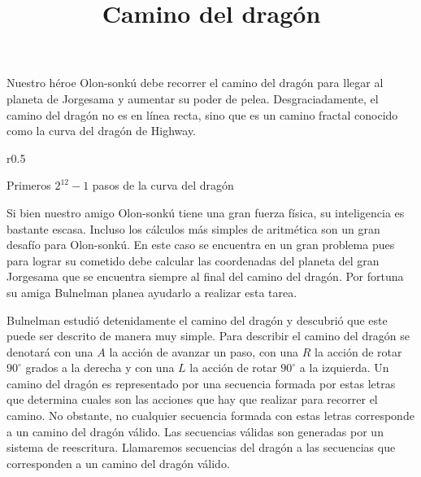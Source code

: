 \documentclass{oci}
\title{Camino del drag\'on}
\begin{document}
\maketitle
Nuestro héroe Olon-sonkú debe recorrer el camino del dragón para llegar al planeta de Jorgesama y aumentar su poder de pelea. Desgraciadamente, el camino del dragón no es en línea recta, sino que es un camino fractal conocido como la curva del dragón de Highway.


\begin{wrapfigure}{r}{0.5\textwidth}
	\begin{center}
			
		Primeros $2^{12}-1$ pasos de la curva del dragón
	\end{center}
\end{wrapfigure}

Si bien nuestro amigo Olon-sonkú tiene una gran fuerza física, su inteligencia es bastante escasa.
Incluso los cálculos más simples de aritmética son un gran desafío para Olon-sonkú.
En este caso se encuentra en un gran problema pues para lograr su cometido debe calcular las coordenadas del planeta del gran Jorgesama que se encuentra siempre al final del camino del dragón.
Por fortuna su amiga Bulnelman planea ayudarlo a realizar esta tarea.

Bulnelman estudió detenidamente el camino del dragón y descubrió que este puede ser descrito de manera muy simple.
Para describir el camino del dragón se denotará con una $A$ la acción de avanzar un paso, con una $R$ la acción de rotar $90^{\circ}$ grados a la derecha y con una $L$ la acción de rotar $90^{\circ}$ a la izquierda.
Un camino del dragón es representado por una secuencia formada por estas letras que determina cuales son las acciones que hay que realizar para recorrer el camino.
No obstante, no cualquier secuencia formada con estas letras corresponde a un camino del dragón válido.
Las secuencias válidas son generadas por un sistema de reescritura.
Llamaremos secuencias del dragón a las secuencias que corresponden a un camino del dragón válido.
\end{document}
